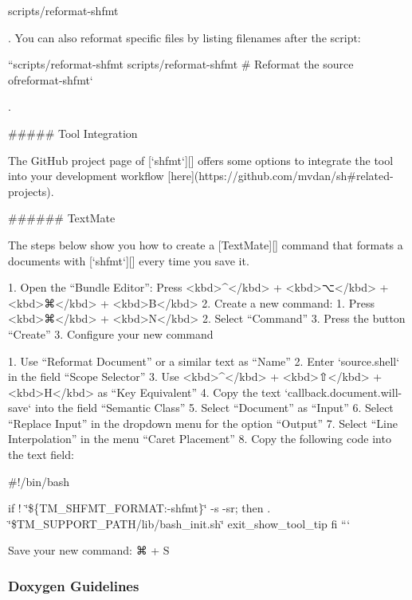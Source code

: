 \begin{DoxyCode}
scripts/reformat-shfmt
\end{DoxyCode}


. You can also reformat specific files by listing filenames after the script\+:

``{\ttfamily  scripts/reformat-\/shfmt scripts/reformat-\/shfmt \# Reformat the source of}reformat-\/shfmt` 
\begin{DoxyCode}
.

##### Tool Integration

The GitHub project page of [`shfmt`][] offers some options to integrate the tool into your development
       workflow [here](https://github.com/mvdan/sh#related-projects).

###### TextMate

The steps below show you how to create a [TextMate][] command that formats a documents with [`shfmt`][]
       every time you save it.

1. Open the “Bundle Editor”: Press <kbd>^</kbd> + <kbd>⌥</kbd> + <kbd>⌘</kbd> + <kbd>B</kbd>
2. Create a new command:
   1. Press <kbd>⌘</kbd> + <kbd>N</kbd>
   2. Select “Command”
   3. Press the button “Create”
3. Configure your new command

   1. Use “Reformat Document” or a similar text as “Name”
   2. Enter `source.shell` in the field “Scope Selector”
   3. Use <kbd>^</kbd> + <kbd>⇧</kbd> + <kbd>H</kbd> as “Key Equivalent”
   4. Copy the text `callback.document.will-save` into the field “Semantic Class”
   5. Select “Document” as “Input”
   6. Select “Replace Input” in the dropdown menu for the option “Output”
   7. Select “Line Interpolation” in the menu “Caret Placement”
   8. Copy the following code into the text field:
\end{DoxyCode}
 \#!/bin/bash

if ! \char`\"{}\$\{\+T\+M\+\_\+\+S\+H\+F\+M\+T\+\_\+\+F\+O\+R\+M\+A\+T\+:-\/shfmt\}\char`\"{} -\/s -\/sr; then . \char`\"{}\$\+T\+M\+\_\+\+S\+U\+P\+P\+O\+R\+T\+\_\+\+P\+A\+T\+H/lib/bash\+\_\+init.\+sh\char`\"{} exit\+\_\+show\+\_\+tool\+\_\+tip fi ```


\begin{DoxyEnumerate}
\item Save your new command\+: {\ttfamily ⌘} + {\ttfamily S}
\end{DoxyEnumerate}

\subsubsection*{Doxygen Guidelines}

